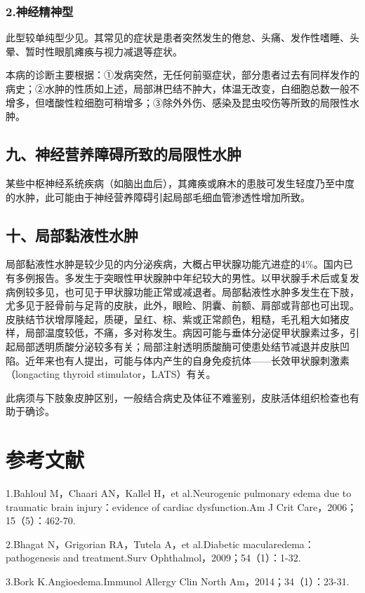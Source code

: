 \subsubsection{2.神经精神型}

此型较单纯型少见。其常见的症状是患者突然发生的倦怠、头痛、发作性嗜睡、头晕、暂时性眼肌瘫痪与视力减退等症状。

本病的诊断主要根据：①发病突然，无任何前驱症状，部分患者过去有同样发作的病史；②水肿的性质如上述，局部淋巴结不肿大，体温无改变，白细胞总数一般不增多，但嗜酸性粒细胞可稍增多；③除外外伤、感染及昆虫咬伤等所致的局限性水肿。

\subsection{九、神经营养障碍所致的局限性水肿}

某些中枢神经系统疾病（如脑出血后），其瘫痪或麻木的患肢可发生轻度乃至中度的水肿，此可能由于神经营养障碍引起局部毛细血管渗透性增加所致。

\subsection{十、局部黏液性水肿}

局部黏液性水肿是较少见的内分泌疾病，大概占甲状腺功能亢进症的4\%。国内已有多例报告。多发生于突眼性甲状腺肿中年纪较大的男性。以甲状腺手术后或复发病例较多见，也可见于甲状腺功能正常或减退者。局部黏液性水肿多发生在下肢，尤多见于胫骨前与足背的皮肤，此外，眼睑、阴囊、前额、肩部或背部也可出现。皮肤结节状增厚隆起，质硬，呈红、棕、紫或正常颜色，粗糙，毛孔粗大如猪皮样，局部温度较低，不痛，多对称发生。病因可能与垂体分泌促甲状腺素过多，引起局部透明质酸分泌较多有关；局部注射透明质酸酶可使患处结节减退并皮肤凹陷。近年来也有人提出，可能与体内产生的自身免疫抗体------长效甲状腺刺激素（longacting
thyroid stimulator，LATS）有关。

此病须与下肢象皮肿区别，一般结合病史及体征不难鉴别，皮肤活体组织检查也有助于确诊。

\protect\hypertarget{text00106.html}{}{}

\section{参考文献}

1.Bahloul M，Chaari AN，Kallel H，et al.Neurogenic pulmonary edema due
to traumatic brain injury：evidence of cardiac dysfunction.Am J Crit
Care，2006；15（5）：462-70.

2.Bhagat N，Grigorian RA，Tutela A，et al.Diabetic
macularedema：pathogenesis and treatment.Surv
Ophthalmol，2009；54（1）：1-32.

3.Bork K.Angioedema.Immunol Allergy Clin North Am，2014；34（1）：23-31.

\protect\hypertarget{text00107.html}{}{}

